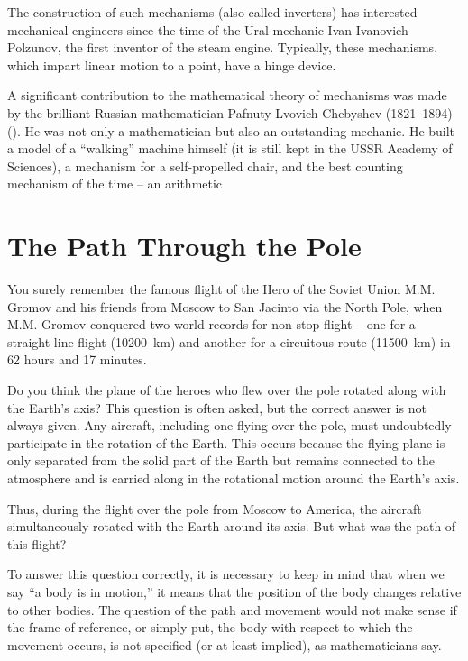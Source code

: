 The construction of such mechanisms (also called inverters) has interested mechanical engineers since the time of the Ural mechanic Ivan Ivanovich Polzunov, the first inventor of the steam engine. Typically, these mechanisms, which impart linear motion to a point, have a hinge device. 


A significant contribution to the mathematical theory of mechanisms was made by the brilliant Russian mathematician Pafnuty Lvovich Chebyshev (1821–1894) (). He was not only a mathematician but also an outstanding mechanic. He built a model of a ``walking'' machine himself (it is still kept in the USSR Academy of Sciences), a mechanism for a self-propelled chair, and the best counting mechanism of the time -- an arithmetic


\section{The Path Through the Pole}
\label{sec-9.12}


You surely remember the famous flight of the Hero of the Soviet Union M.M. Gromov and his friends from Moscow to San Jacinto via the North Pole, when M.M. Gromov conquered two world records for non-stop flight -- one for a straight-line flight (\SI{10200}{\kilo\meter}) and another for a circuitous route (\SI{11500}{\kilo\meter}) in 62 hours and 17 minutes.

Do you think the plane of the heroes who flew over the pole rotated along with the Earth's axis? This question is often asked, but the correct answer is not always given. Any aircraft, including one flying over the pole, must undoubtedly participate in the rotation of the Earth. This occurs because the flying plane is only separated from the solid part of the Earth but remains connected to the atmosphere and is carried along in the rotational motion around the Earth's axis.

Thus, during the flight over the pole from Moscow to America, the aircraft simultaneously rotated with the Earth around its axis. But what was the path of this flight?

To answer this question correctly, it is necessary to keep in mind that when we say ``a body is in motion,'' it means that the position of the body changes relative to other bodies. The question of the path and movement would not make sense if the frame of reference, or simply put, the body with respect to which the movement occurs, is not specified (or at least implied), as mathematicians say.

